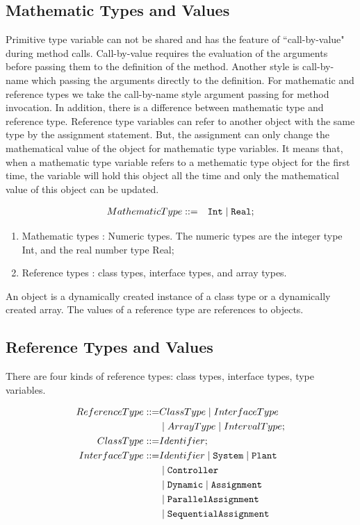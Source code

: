 \documentclass{WileySix}
\begin{document}
\subsection{Mathematic Types and Values}
Primitive type variable 
can not be shared and has the feature of ``call-by-value" during method calls. 
Call-by-value requires the evaluation of the arguments before passing them to the definition of the method. Another style is call-by-name which passing the arguments directly to the definition.
For mathematic and reference types we take the call-by-name style argument passing for method invocation. In addition, there is a difference between mathematic type and reference type. Reference type variables can refer to another object with the same type by the assignment statement. But, the assignment can only change the mathematical value of the object for mathematic type variables. It means that, when a mathematic type variable refers to a methematic type object for the first time, the variable will hold this object all the time and only the mathematical value of this object can be updated.

\begin{eqnarray*}
 MathematicType  &::=&   {\tt Int} \mid {\tt Real};\\
\end{eqnarray*}

\begin{enumerate}
\item Mathematic types : Numeric types. 
The numeric types are the integer type Int, and the real number type
Real;
\item  Reference types : class types, interface types, and array types.
\end{enumerate}




An object is a dynamically created instance of a class type or a dynamically 
created array. The values of a reference type are references to objects.

\subsection{Reference Types and Values}

There are four kinds of reference types: class types, interface types, type variables.

\begin{align*}
 ReferenceType  ::=&  ClassType  \mid  InterfaceType   \\
                   &  \mid  ArrayType \mid IntervalType ;\\
 ClassType  ::=&  Identifier ;\\
 InterfaceType  ::=&  Identifier  \mid {\tt System} \mid {\tt Plant} \\
& \mid  {\tt Controller}\\
& \mid {\tt Dynamic} \mid {\tt Assignment} \\
& \mid {\tt ParallelAssignment} \\
& \mid {\tt SequentialAssignment} 
\end{align*}
\end{document}

